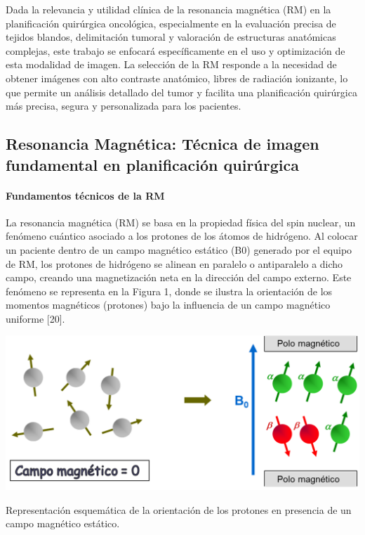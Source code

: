 Dada la relevancia y utilidad clínica de la resonancia magnética (RM) en la planificación quirúrgica oncológica, especialmente en la evaluación precisa de tejidos blandos, delimitación tumoral y valoración de estructuras anatómicas complejas, este trabajo se enfocará específicamente en el uso y optimización de esta modalidad de imagen. La selección de la RM responde a la necesidad de obtener imágenes con alto contraste anatómico, libres de radiación ionizante, lo que permite un análisis detallado del tumor y facilita una planificación quirúrgica más precisa, segura y personalizada para los pacientes. 

\subsection{Resonancia Magnética: Técnica de imagen fundamental en planificación quirúrgica}
\label{sec:challenges-surgical-planning}


\paragraph{Fundamentos técnicos de la RM} 

La resonancia magnética (RM) se basa en la propiedad física del spin nuclear, un fenómeno cuántico asociado a los protones de los átomos de hidrógeno. Al colocar un paciente dentro de un campo magnético estático (B0) generado por el equipo de RM, los protones de hidrógeno se alinean en paralelo o antiparalelo a dicho campo, creando una magnetización neta en la dirección del campo externo. Este fenómeno se representa en la Figura 1, donde se ilustra la orientación de los momentos magnéticos (protones) bajo la influencia de un campo magnético uniforme [20]. 

\begin{marginfigure}[-6cm]
\includegraphics[width=\linewidth]{imagenes/campomagnetico.png}
\caption{Representación esquemática de la orientación de los protones en presencia de un campo magnético estático.}
\label{fig:Esquema}
\end{marginfigure}

